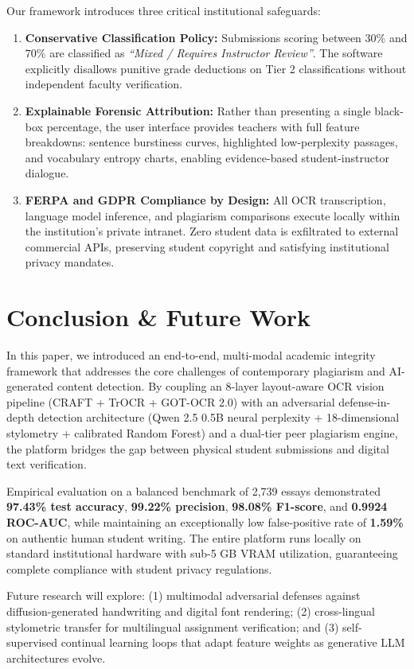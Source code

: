 \documentclass[journal]{IEEEtran}
\begin{document}
Our framework introduces three critical institutional safeguards:
\begin{enumerate}
    \item \textbf{Conservative Classification Policy:} Submissions scoring between $30\%$ and $70\%$ are classified as \textit{``Mixed / Requires Instructor Review''}. The software explicitly disallows punitive grade deductions on Tier 2 classifications without independent faculty verification.
    \item \textbf{Explainable Forensic Attribution:} Rather than presenting a single black-box percentage, the user interface provides teachers with full feature breakdowns: sentence burstiness curves, highlighted low-perplexity passages, and vocabulary entropy charts, enabling evidence-based student-instructor dialogue.
    \item \textbf{FERPA and GDPR Compliance by Design:} All OCR transcription, language model inference, and plagiarism comparisons execute locally within the institution's private intranet. Zero student data is exfiltrated to external commercial APIs, preserving student copyright and satisfying institutional privacy mandates.
\end{enumerate}

\section{Conclusion \& Future Work}
In this paper, we introduced an end-to-end, multi-modal academic integrity framework that addresses the core challenges of contemporary plagiarism and AI-generated content detection. By coupling an 8-layer layout-aware OCR vision pipeline (CRAFT + TrOCR + GOT-OCR 2.0) with an adversarial defense-in-depth detection architecture (Qwen 2.5 0.5B neural perplexity + 18-dimensional stylometry + calibrated Random Forest) and a dual-tier peer plagiarism engine, the platform bridges the gap between physical student submissions and digital text verification.

Empirical evaluation on a balanced benchmark of 2,739 essays demonstrated \textbf{97.43\% test accuracy}, \textbf{99.22\% precision}, \textbf{98.08\% F1-score}, and \textbf{0.9924 ROC-AUC}, while maintaining an exceptionally low false-positive rate of \textbf{1.59\%} on authentic human student writing. The entire platform runs locally on standard institutional hardware with sub-5 GB VRAM utilization, guaranteeing complete compliance with student privacy regulations.

Future research will explore: (1) multimodal adversarial defenses against diffusion-generated handwriting and digital font rendering; (2) cross-lingual stylometric transfer for multilingual assignment verification; and (3) self-supervised continual learning loops that adapt feature weights as generative LLM architectures evolve.



\end{document}
